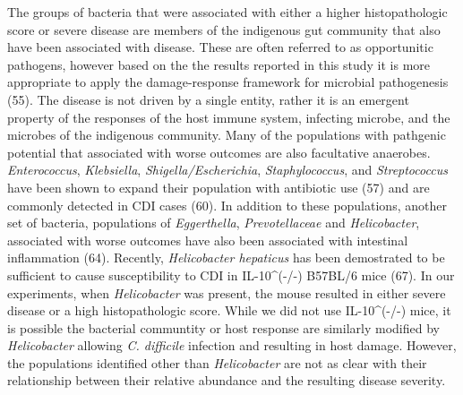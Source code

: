 \documentclass[
  12pt,
]{article}
\begin{document}
The groups of bacteria that were associated with either a higher
histopathologic score or severe disease are members of the indigenous
gut community that also have been associated with disease. These are
often referred to as opportunitic pathogens, however based on the the
results reported in this study it is more appropriate to apply the
damage-response framework for microbial pathogenesis (55). The disease
is not driven by a single entity, rather it is an emergent property of
the responses of the host immune system, infecting microbe, and the
microbes of the indigenous community. Many of the populations with
pathgenic potential that associated with worse outcomes are also
facultative anaerobes. \emph{Enterococcus}, \emph{Klebsiella},
\emph{Shigella/Escherichia}, \emph{Staphylococcus}, and
\emph{Streptococcus} have been shown to expand their population with
antibiotic use (57) and are commonly detected in CDI cases (60). In
addition to these populations, another set of bacteria, populations of
\emph{Eggerthella}, \emph{Prevotellaceae} and \emph{Helicobacter},
associated with worse outcomes have also been associated with intestinal
inflammation (64). Recently, \emph{Helicobacter hepaticus} has been
demostrated to be sufficient to cause susceptibility to CDI in
IL-10\^{}(-/-) B57BL/6 mice (67). In our experiments, when
\emph{Helicobacter} was present, the mouse resulted in either severe
disease or a high histopathologic score. While we did not use
IL-10\^{}(-/-) mice, it is possible the bacterial communtity or host
response are similarly modified by \emph{Helicobacter} allowing \emph{C.
difficile} infection and resulting in host damage. However, the
populations identified other than \emph{Helicobacter} are not as clear
with their relationship between their relative abundance and the
resulting disease severity.
\end{document}
